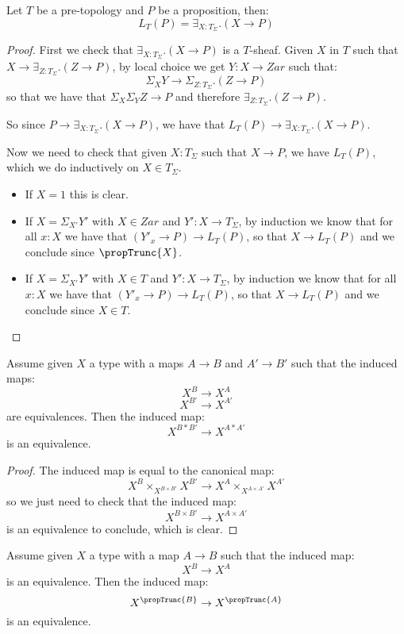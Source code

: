 \begin{lemma}\label{Tsigma-proposition}
Let $T$ be a pre-topology and $P$ be a proposition, then:
\[L_T(P) = \exists_{X:T_\Sigma}. (X\to P)\]
\end{lemma}

\begin{proof}
First we check that $\exists_{X:T_\Sigma}. (X\to P)$ is a $T$-sheaf. Given $X$ in $T$ such that $X\to \exists_{Z:T_\Sigma}. (Z\to P)$, by local choice we get $Y:X\to Zar$ such that:
\[\Sigma_XY\to \Sigma_{Z:T_\Sigma}.(Z\to P)\]
so that we have that $\Sigma_X\Sigma_YZ\to P$ and therefore $\exists_{Z:T_\Sigma}.(Z\to P)$.

So since $P\to \exists_{X:T_\Sigma}. (X\to P)$, we have that $L_T(P)\to \exists_{X:T_\Sigma}. (X\to P)$.

Now we need to check that given $X:T_\Sigma$ such that $X\to P$, we have $L_T(P)$, which we do inductively on $X\in T_\Sigma$.
\begin{itemize}
\item If $X=1$ this is clear.
\item If $X=\Sigma_{X'}Y'$ with $X\in Zar$ and $Y':X\to T_\Sigma$, by induction we know that for all $x:X$ we have that $(Y'_x\to P)\to L_T(P)$, so that $X\to L_T(P)$ and we conclude since $\propTrunc{X}$.
\item If $X=\Sigma_{X'}Y'$ with $X\in T$ and $Y':X\to T_\Sigma$, by induction we know that for all $x:X$ we have that $(Y'_x\to P)\to L_T(P)$, so that $X\to L_T(P)$ and we conclude since $X\in T$.
\end{itemize}
\end{proof}

\begin{lemma}\label{localisation-stable-join}
Assume given $X$ a type with a maps $A\to B$ and $A'\to B'$ such that the induced maps:
\[X^B\to X^A\]
\[X^{B'}\to X^{A'}\]
are equivalences. Then the induced map:
\[X^{B*B'}\to X^{A*A'}\]
is an equivalence.
\end{lemma}

\begin{proof}
The induced map is equal to the canonical map:
\[X^B\times_{X^{B\times B'}}X^{B'}\to X^A\times_{X^{A\times A'}}X^{A'}\]
so we just need to check that the induced map:
\[X^{B\times B'}\to X^{A\times A'}\]
is an equivalence to conclude, which is clear.
\end{proof}

\begin{lemma}\label{localisation-stable-trucnation}
Assume given $X$ a type with a map $A\to B$ such that the induced map:
\[X^B\to X^A\]
is an equivalence. Then the induced map:
\[X^{\propTrunc{B}}\to X^{\propTrunc{A}}\]
is an equivalence.
\end{lemma}

